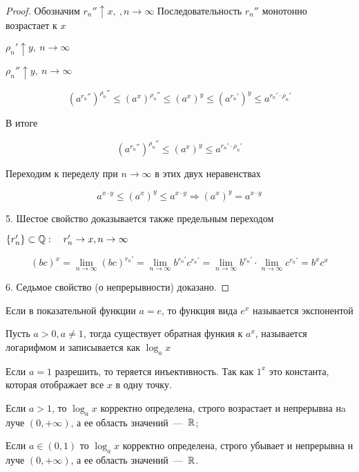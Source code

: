 \begin{proof}
Обозначим $r_{n}'' \uparrow x, \ , n \to \infty$ Последовательность $r_n''$ монотонно возрастает к $x$
    
$\rho_{n}' \uparrow y, \ n \to \infty$
    
$\rho_{n}'' \uparrow y, \ n \to \infty$
    
$$(a^{r_{n}''})^{\rho_{n}''} \leq (a^{x})^{\rho_{n}''} \leq (a^{x})^{y} \leq (a^{r_{n}'})^{y} \leq a^{r_{n}' \cdot \rho_{n}'}$$
    
В итоге 
    
$$(a^{r_{n}''})^{\rho_{n}''} \leq (a^{x})^{y} \leq a^{r_{n}' \cdot \rho_{n}'}$$
    
Переходим к переделу при $n \to \infty$ в этих двух неравенствах
    
$$a^{x \cdot y} \leq (a^{x})^{y} \leq a^{x \cdot y} \Rightarrow (a^{x})^{y} = a^{x \cdot y}$$

5. Шестое свойство доказывается также предельным переходом

$\{r_{n}'\} \subset \mathbb{Q} : \quad r_{n}' \to x, n \to \infty$
    
$$(bc)^x = \lim\limits_{n \to \infty} (bc)^{r_n'} = \lim\limits_{n \to \infty} b^{r_n'}c^{r_n'} = \lim\limits_{n \to \infty} b^{r_n'} \cdot \lim\limits_{n \to \infty} c^{r_n'} = b^x c^x$$

6. Седьмое свойство (о непрерывности) доказано.

\end{proof}

\begin{definition}
Если в показательной функции $a = e$, то функция вида $e^x$ называется экспонентой
\end{definition}

\begin{definition}
Пусть $a > 0, a \neq 1$, тогда существует обратная функия к $a^x$, называется логарифмом и записывается как $\log_a x$
\end{definition}

\begin{note}
Если $a = 1$ разрешить, то теряется инъективность. Так как $1^x$ это константа, которая отображает все $x$ в одну точку.
\end{note}

\begin{theorem} 
Если $a > 1$, то $\log_a x$ корректно определена, строго возрастает и непрерывна нa луче $(0, +\infty)$, а ее область значений~---~$\mathbb{R}$; 

Если $a \in (0, 1)$ то $\log_a x$ корректно определена, строго убывает и непрерывна н луче $(0, +\infty)$, а ее область значений~---~$\mathbb{R}$.
\end{theorem}

